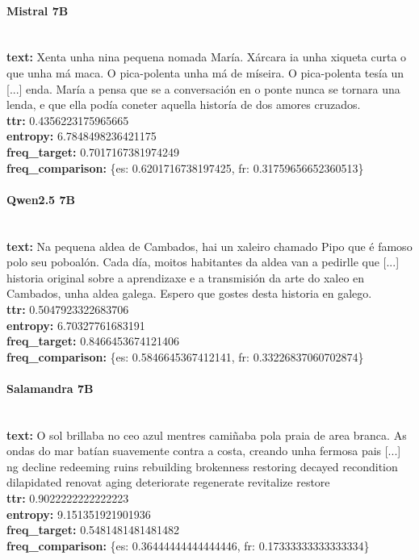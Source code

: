 \paragraph{Mistral 7B}~\\
\textbf{text:} Xenta unha nina pequena nomada María. Xárcara ia unha xiqueta curta o que unha má maca. O pica-polenta unha má de míseira. O pica-polenta tesía un [...] enda. María a pensa que se a conversación en o ponte nunca se tornara una lenda, e que ella podía coneter aquella historía de dos amores cruzados.\\
\textbf{ttr:} 0.4356223175965665\\
\textbf{entropy:} 6.7848498236421175\\
\textbf{freq\_target:} 0.7017167381974249\\
\textbf{freq\_comparison:} \{\textquotesingle{}es\textquotesingle{}: 0.6201716738197425, \textquotesingle{}fr\textquotesingle{}: 0.31759656652360513\}

\paragraph{Qwen2.5 7B}~\\
\textbf{text:} Na pequena aldea de Cambados, hai un xaleiro chamado Pipo que é famoso polo seu poboalón. Cada día, moitos habitantes da aldea van a pedirlle que  [...] historia original sobre a aprendizaxe e a transmisión da arte do xaleo en Cambados, unha aldea galega. Espero que gostes desta historia en galego.\\
\textbf{ttr:} 0.5047923322683706\\
\textbf{entropy:} 6.70327761683191\\
\textbf{freq\_target:} 0.8466453674121406\\
\textbf{freq\_comparison:} \{\textquotesingle{}es\textquotesingle{}: 0.5846645367412141, \textquotesingle{}fr\textquotesingle{}: 0.33226837060702874\}

\paragraph{Salamandra 7B}~\\
\textbf{text:} O sol brillaba no ceo azul mentres camiñaba pola praia de area branca. As ondas do mar batían suavemente contra a costa, creando unha fermosa pais [...] ng decline redeeming ruins rebuilding brokenness restoring decayed recondition dilapidated renovat aging deteriorate regenerate revitalize restore\\
\textbf{ttr:} 0.9022222222222223\\
\textbf{entropy:} 9.151351921901936\\
\textbf{freq\_target:} 0.5481481481481482\\
\textbf{freq\_comparison:} \{\textquotesingle{}es\textquotesingle{}: 0.36444444444444446, \textquotesingle{}fr\textquotesingle{}: 0.17333333333333334\}

